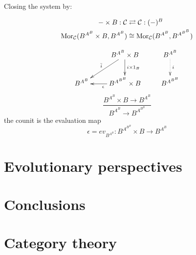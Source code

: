 \documentclass[aps,twocolumn]{revtex4-1}
\begin{document}
Closing the system by:

\begin{align*}
- \times B: \mathcal{C} & \rightleftarrows \mathcal{C}: (-)^B\\
\mathop{\rm Mor}\nolimits_{\mathcal{C}}(B^{A^B} \times B, B^{A^B}) & \cong  \mathop{\rm Mor}\nolimits_{\mathcal{C}}(B^{A^B}, B^{A^{B^B}})
\end{align*}

			$$
			\xymatrix{
			& B^{A^B} \times B \ar[d]^-{i \times 1_B} \ar[dl]_{\bar{i}} & B^{A^B} \ar@{.>}[d]^-{i}\\
			B^{A^B} & B^{A^{B^B}} \times B \ar[l]^{\epsilon} & B^{A^{B^B}}
			}
			$$
		$$
			\frac{B^{A^B} \times B \longrightarrow B^{A^B}}{B^{A^B} \longrightarrow B^{A^{B^B}}}
		$$
		the counit is the evaluation map
		$$
			\epsilon = ev_{B^{A^B}} \colon B^{A^{B^B}} \times B \longrightarrow B^{A^B}
		$$
	
\section{Evolutionary perspectives}

\section{Conclusions}


 



\appendix

\section{Category theory}\label{app:CatTh}


%
\end{document}
